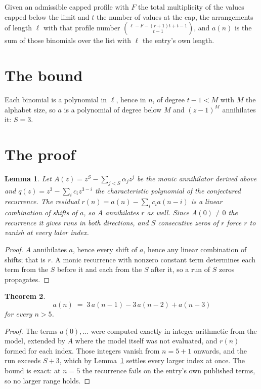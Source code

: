 \documentclass[11pt,a4paper]{article}
\theoremstyle{plain}
\newtheorem{theorem}{Theorem}
\newtheorem{lemma}[theorem]{Lemma}
\theoremstyle{definition}
\begin{document}
Given an admissible capped profile with $F$ the total multiplicity of the values capped below
the limit and $t$ the number of values at the cap, the arrangements of length $\ell$ with that
profile number $\binom{\ell-F-(r+1)t+t-1}{t-1}$, and $a(n)$ is the sum of those binomials
over the list with $\ell$ the entry's own length.

\section{The bound}

Each binomial is a polynomial in $\ell$, hence in $n$, of degree $t-1<M$ with $M$ the alphabet
size, so $a$ is a polynomial of degree below $M$ and $(z-1)^{M}$ annihilates it: $S=3$.

\section{The proof}

\begin{lemma}\label{lem:crit}
Let $A(z)=z^S-\sum_{j<S}\alpha_jz^{j}$ be the monic annihilator derived above and
$q(z)=z^{3}-\sum_ic_iz^{3-i}$ the characteristic polynomial of the conjectured
recurrence. The residual $r(n)=a(n)-\sum_ic_ia(n-i)$ is a linear combination of shifts of $a$,
so $A$ annihilates $r$ as well. Since $A(0)\ne0$ the recurrence it gives runs in both
directions, and $S$ consecutive zeros of $r$ force $r$ to vanish at every later index.
\end{lemma}

\begin{proof}
$A$ annihilates $a$, hence every shift of $a$, hence any linear combination of shifts; that is
$r$. A monic recurrence with nonzero constant term determines each term from the $S$ before it
and each from the $S$ after it, so a run of $S$ zeros propagates.
\end{proof}

\begin{theorem}
\[
a(n)\;=\;3\,a(n-1) - 3\,a(n-2) + a(n-3)
\]
for every $n>5$.
\end{theorem}

\begin{proof}
The terms $a(0),\dots$ were computed exactly in integer arithmetic from the model, extended by
$A$ where the model itself was not evaluated, and $r(n)$ formed for each index. Those integers
vanish from $n=5+1$ onwards, and the run exceeds $S+3$, which by
Lemma~\ref{lem:crit} settles every larger index at once. The bound is exact: at $n=5$ the recurrence fails on the entry's own published terms, so no larger range holds.
\end{proof}
\end{document}
